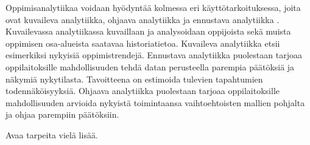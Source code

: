 Oppimisanalytiikaa voidaan hyödyntää kolmessa eri käyttötarkoituksessa, joita ovat kuvaileva analytiikka, ohjaava analytiikka ja ennustava analytiikka \citep{auvinenOppimisanalytiikkaTuleeOletko2017, danielBigDataAnalytics2015}. Kuvailevassa analytiikassa kuvaillaan ja analysoidaan oppijoista sekä muista oppimisen osa-alueista saatavaa historiatietoa. Kuvaileva analytiikka etsii esimerkiksi nykyisiä oppimistrendejä. Ennustava analytiikka puolestaan tarjoaa oppilaitoksille mahdollisuuden tehdä datan perusteella parempia päätöksiä ja näkymiä nykytilasta. Tavoitteena on estimoida tulevien tapahtumien todennäköisyyksiä. Ohjaava analytiikka puolestaan tarjoaa oppilaitoksille mahdollisuuden arvioida nykyistä toimintaansa vaihtoehtoisten mallien pohjalta ja ohjaa parempiin päätöksiin.


\color{red} Avaa tarpeita vielä lisää. \color{black}
